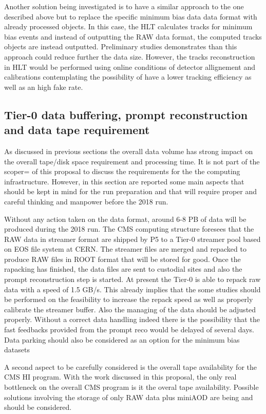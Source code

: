 Another solution being investigated is to have a similar approach to the one described above but to replace the specific minimum bias data data format with already processed objects. In this case, the HLT calculates tracks for minimum bias events and instead of outputting the RAW data format, the computed tracks objects are instead outputted. Preliminary studies demonstrates than this approach could reduce further the data size. However, the tracks reconstruction in HLT would be performed using online conditions of detector allignement and calibrations contemplating the possibility of have a lower tracking efficiency as well as an high fake rate. 


\subsection{Tier-0 data buffering, prompt reconstruction and data tape requirement\label{subsec:Tier-0AndProcessing}}
As discussed in previous sections the overall data volume has strong impact on the overall tape/disk space requirement and processing time. It is not part of the scoper= of this proposal to discuss the requirements for the the computing infrastructure. However, in this section are reported some main aspects that should be kept in mind for the run preparation and that will require proper and careful thinking and manpower before the 2018 run.

Without any action taken on the data format, around 6-8 PB of data will be produced during the 2018 run. The CMS computing structure foresees that the RAW data in streamer format are shipped by P5 to a Tier-0 streamer pool based on EOS file system at CERN. The streamer files are merged and repacked to produce RAW files in ROOT format that will be stored for good. Once the rapacking has finished, the data files are sent to custodial sites and also the prompt reconstruction step is started. At present the Tier-0 is able to repack raw data with a speed of 1.5 GB/s. This already implies that the some studies should be performed on the feasibility to increase the repack speed as well as properly calibrate the streamer buffer. Also the managing of the data should be adjusted properly. Without a correct data handling indeed there is the possibility that the fast feedbacks provided from the prompt reco would be delayed of several days. Data parking should also be considered as an option for the minimum bias datasets

A second aspect to be carefully considered is the overall tape availability for the CMS HI program. With the work discussed in this proposal, the only real bottleneck on the overall CMS program is it the overal tape availability. Possible solutions involving the storage of only RAW data plus miniAOD are being and should be considered.

